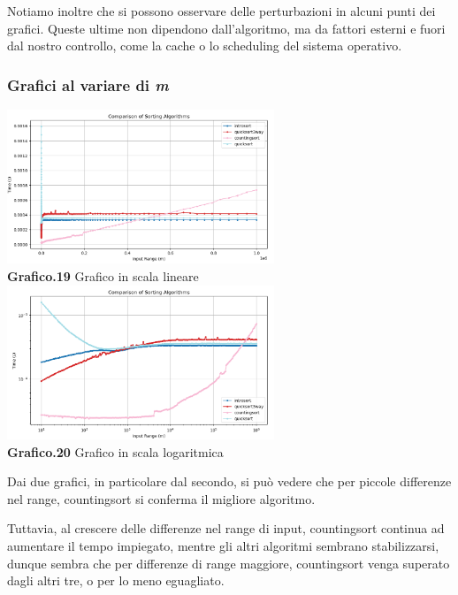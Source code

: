 \documentclass{article}
\begin{document}
            Notiamo inoltre che si possono osservare delle perturbazioni in alcuni punti dei grafici. Queste ultime non dipendono dall'algoritmo, ma da fattori esterni e fuori dal nostro controllo, come la cache o lo scheduling del sistema operativo.

        \subsubsection{Grafici al variare di \textit{m}}
            \begin{center}
                \includegraphics[width=0.6\textwidth]{Tutti_InputRange.png} \\
                \textbf{Grafico.19} Grafico in scala lineare\\
                \vspace{0.5cm}
                \includegraphics[width=0.6\textwidth]{Tutti_InputRange_Log.png} \\
                \textbf{Grafico.20} Grafico in scala logaritmica\\
                \vspace{0.5cm}
            \end{center}
            Dai due grafici, in particolare dal secondo, si può vedere che per piccole differenze nel range, countingsort si conferma il migliore algoritmo.
            
            Tuttavia, al crescere delle differenze nel range di input, countingsort continua ad aumentare il tempo impiegato, mentre gli altri algoritmi sembrano stabilizzarsi, dunque sembra che per differenze di range maggiore, countingsort venga superato dagli altri tre, o per lo meno eguagliato.
\end{document}
